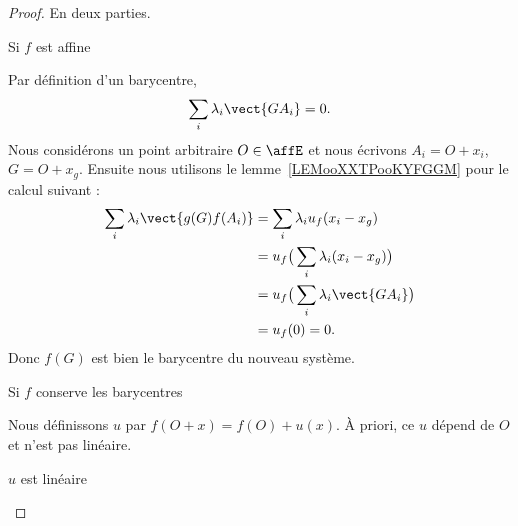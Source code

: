 \begin{proof}
    En deux parties.
    \begin{subproof}
        \item[Si \( f\) est affine]

            Par définition d'un barycentre,
            \begin{equation}
                \sum_i\lambda_i\vect{ GA_i }=0.
            \end{equation}
            Nous considérons un point arbitraire \( O\in\affE\) et nous écrivons \( A_i=O+x_i\), \( G=O+x_g\). Ensuite nous utilisons le lemme~\ref{LEMooXXTPooKYFGGM} pour le calcul suivant :
            \begin{subequations}
                \begin{align}
                    \sum_i\lambda_i\vect{ g(G)f(A_i) }&=\sum_i\lambda_iu_f(x_i-x_g)\\
                    &=u_f\big( \sum_i\lambda_i(x_i-x_g) \big)\\
                    &=u_f\big( \sum_i\lambda_i\vect{ GA_i } \big)\\
                    &=u_f(0)=0.
                \end{align}
            \end{subequations}
            Donc \( f(G)\) est bien le barycentre du nouveau système.

        \item[Si \( f\) conserve les barycentres]

            Nous définissons \( u\) par \( f(O+x)=f(O)+u(x)\). À priori, ce \( u\) dépend de \( O\) et n'est pas linéaire.
            \begin{subproof}
            \item[\( u\) est linéaire]


\end{subproof}
\end{subproof}
\end{proof}
